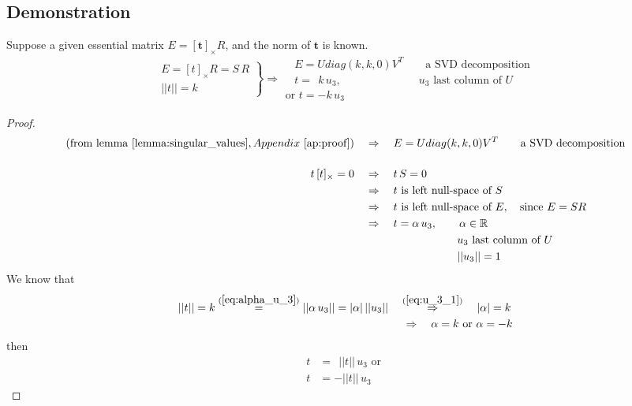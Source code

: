 \subsection{Demonstration}
\begin{theorem}
\label{th:norm}
Suppose a given essential matrix $E=[\mathbf{t}]_{\times}R$, and the norm of $\mathbf{t}$ is known.
\[ \left.
  \begin{array}{l}
  E =[t]_{\times}R = S\,R \\
  ||t||=k
  \end{array} \right\}
  \Rightarrow
  \begin{array}{l}
  ~ ~ ~ \, E = U diag(k,k,0) V^T            \quad\quad\mbox{a SVD decomposition} \\
  ~ ~ ~ \, t= ~ ~ k\,u_3,  \quad\quad\quad\quad\quad\quad\quad u_3 \mbox{~last column of~} U \\
  \mbox{or~} t=-k\,u_3
  \end{array}
\]
\end{theorem}

\begin{proof}
\begin{align}
(\mbox{from lemma~} \ref{lemma:singular_values}, Appendix ~\ref{ap:proof})  & \quad\Rightarrow\quad E = U diag(k,k,0) V^T            \quad\quad\mbox{a SVD decomposition} \nonumber \\[3ex]
 t\,[t]_{\times} = 0 & \quad\Rightarrow\quad  t\,S = 0 \nonumber \\
                     & \quad\Rightarrow\quad  t \mbox{~is left null-space of~} S \nonumber \\
                     & \quad\Rightarrow\quad  t \mbox{~is left null-space of~} E, \quad \mbox{since~} E=SR \nonumber \\
                     & \quad\Rightarrow\quad  t = \alpha\,u_3, \quad\quad \alpha \in \mathbb{R}  \label{eq:alpha_u_3} \\
                     & ~~~~~~~~~~~~~~~~~~~~~~ \quad\quad u_3 \mbox{~last column of~} U  \nonumber \\
                     & ~~~~~~~~~~~~~~~~~~~~~~ \quad\quad ||u_3|| = 1  \label{eq:u_3_1}
\end{align}
We know that
\begin{align*}
 ||t||=k \overset{(\ref{eq:alpha_u_3})}{=} ||\alpha\,u_3|| = |\alpha|\,||u_3|| & \quad\overset{(\ref{eq:u_3_1})}{\Rightarrow}\quad  |\alpha| = k  \\
 & ~ \quad\Rightarrow\quad \alpha = k \mbox{~or~} \alpha = -k
\end{align*}
then
\begin{align*}
 t & = ~~||t||\,u_3 \mbox{~or~} \\
 t & = - ||t||\,u_3
\end{align*}
\end{proof}


